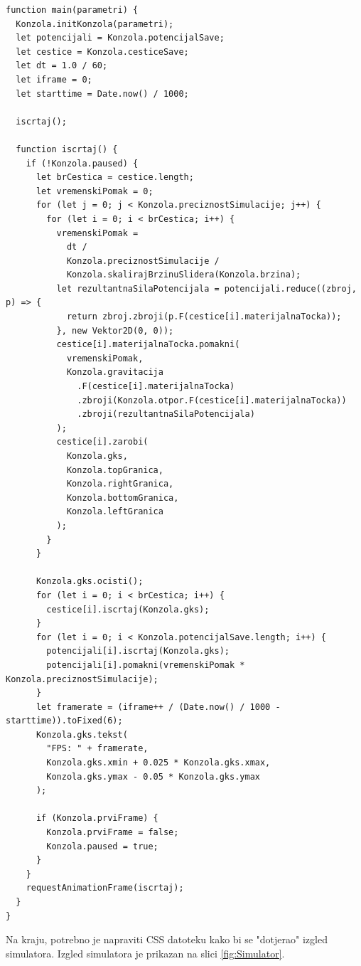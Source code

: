\documentclass{foi}
\begin{document}
\begin{verbatim}
function main(parametri) {
  Konzola.initKonzola(parametri);
  let potencijali = Konzola.potencijalSave;
  let cestice = Konzola.cesticeSave;
  let dt = 1.0 / 60;
  let iframe = 0;
  let starttime = Date.now() / 1000;

  iscrtaj();

  function iscrtaj() {
    if (!Konzola.paused) {
      let brCestica = cestice.length;
      let vremenskiPomak = 0;
      for (let j = 0; j < Konzola.preciznostSimulacije; j++) {
        for (let i = 0; i < brCestica; i++) {
          vremenskiPomak =
            dt /
            Konzola.preciznostSimulacije /
            Konzola.skalirajBrzinuSlidera(Konzola.brzina);
          let rezultantnaSilaPotencijala = potencijali.reduce((zbroj, p) => {
            return zbroj.zbroji(p.F(cestice[i].materijalnaTocka));
          }, new Vektor2D(0, 0));
          cestice[i].materijalnaTocka.pomakni(
            vremenskiPomak,
            Konzola.gravitacija
              .F(cestice[i].materijalnaTocka)
              .zbroji(Konzola.otpor.F(cestice[i].materijalnaTocka))
              .zbroji(rezultantnaSilaPotencijala)
          );
          cestice[i].zarobi(
            Konzola.gks,
            Konzola.topGranica,
            Konzola.rightGranica,
            Konzola.bottomGranica,
            Konzola.leftGranica
          );
        }
      }

      Konzola.gks.ocisti();
      for (let i = 0; i < brCestica; i++) {
        cestice[i].iscrtaj(Konzola.gks);
      }
      for (let i = 0; i < Konzola.potencijalSave.length; i++) {
        potencijali[i].iscrtaj(Konzola.gks);
        potencijali[i].pomakni(vremenskiPomak * Konzola.preciznostSimulacije);
      }
      let framerate = (iframe++ / (Date.now() / 1000 - starttime)).toFixed(6);
      Konzola.gks.tekst(
        "FPS: " + framerate,
        Konzola.gks.xmin + 0.025 * Konzola.gks.xmax,
        Konzola.gks.ymax - 0.05 * Konzola.gks.ymax
      );

      if (Konzola.prviFrame) {
        Konzola.prviFrame = false;
        Konzola.paused = true;
      }
    }
    requestAnimationFrame(iscrtaj);
  }
}

\end{verbatim}
Na kraju, potrebno je napraviti CSS datoteku kako bi se "dotjerao" izgled simulatora. Izgled simulatora je prikazan na slici \ref{fig:Simulator}.
\end{document}
